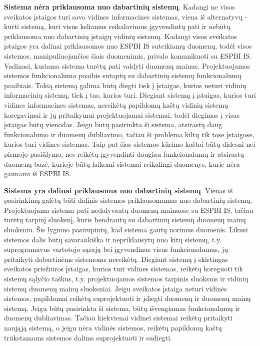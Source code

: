 \textbf{Sistema nėra priklausoma nuo dabartinių sistemų}. Kadangi ne visos sveikatos įstaigos turi savo vidines informacines sistemas, viena iš alternatyvų - kurti sistemą, kuri visus keliamus reikalavimus įgyvendintų pati ir nebūtų priklausoma nuo dabartinių įstaigų vidinių sistemų. Kadangi visos sveikatos įstaigos yra dalinai priklausomos nuo ESPBI IS suteikiamų duomenų, todėl visos sistemos, manipuliuojančios šiais duomenimis, privalo komunikuoti su ESPBI IS. Vadinasi, kuriama sistema turėtų pati valdyti duomenų mainus. Projektuojamos sistemos funkcionalumo poaibis sutaptų su dabartinių sistemų funkcionalumų poaibiais. Tokią sistemą galima būtų diegti tiek į įstaigas, kurios neturi vidinių informacinių sistemų, tiek į tas, kurios turi. Diegiant sistemą į įstaigas, kurios turi vidines informacines sistemas, nereikėtų papildomų kaštų vidinių sistemų koregavimui ir jų pritaikymui projektuojamai sistemai, todėl diegimas į visas įstaigas būtų vienodas. Jeigu būtų pasirinkta ši sistema, atsirastų daug funkcionalumo ir duomenų dubliavimo, tačiau ši problema kiltų tik tose įstaigose, kurios turi vidines sistemas. Taip pat šios sistemos kūrimo kaštai būtų didesni nei pirmojo pasiūlymo, nes reikėtų įgyvendinti daugiau funkcionalumų ir atsirastų duomenų bazė, kurioje būtų laikomi sistemai reikalingi duomenys, kurie nėra gaunami iš ESPBI IS.

\textbf{Sistema yra dalinai priklausoma nuo dabartinių sistemų}. Vienas iš pasirinkimų galėtų būti dalinis sistemos priklausomumas nuo dabartinių sistemų. Projektuojama sistema pati nedalyvautų duomenų mainuose su ESPBI IS, tačiau turėtų tarpinį sluoksnį, kuris bendrautų su dabartinių sistemų duomenų mainų sluoksniu. Šis lygmuo pasirūpintų, kad sistema gautų norimus duomenis. Likusi sistemos dalis būtų savarankiška ir nepriklausytų nuo kitų sistemų, t.y. suprogramavus vartotojo sąsają bei įgyvendinus visus funkcionalumus, jų pritaikyti dabartinėms sistemoms nereikėtų. Diegiant sistemą į skirtingas sveikatos priežiūros įstaigas, kurios turi vidines sistemas, reikėtų koreguoti tik sistemų sąlyčio taškus, t.y. projektuojamos sistemos tarpinis sluoksnis ir vidinių sistemų duomenų mainų sluoksniai. Jeigu sveikatos įstaiga neturi vidinės sistemos, papildomai reikėtų suprojektuoti ir įdiegti duomenų ir duomenų mainų sistemą. Jeigu būtų pasirinkta ši sistema, būtų išvengiamas funkcionalumų ir duomenų dubliavimas. Tačiau kiekvienai vidinei sistemai reikėtų pritaikyti naująją sistemą, o jeigu nėra vidinės sistemos, reikėtų papildomų kaštų trūkstamoms sistemos dalims suprojektuoti ir sudiegti.

